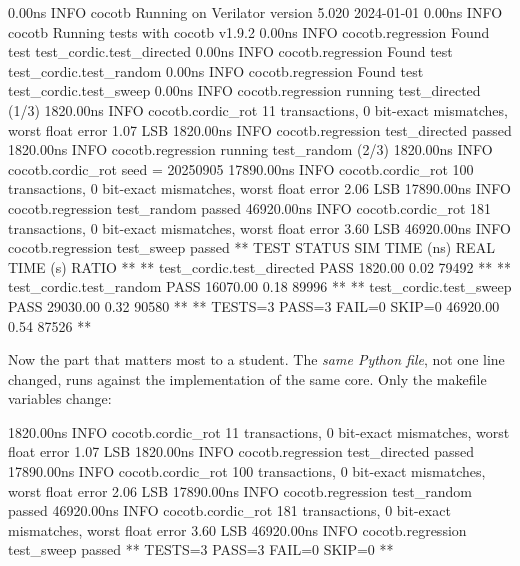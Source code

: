 \begin{txtcode}
     0.00ns INFO  cocotb  Running on Verilator version 5.020 2024-01-01
     0.00ns INFO  cocotb  Running tests with cocotb v1.9.2
     0.00ns INFO  cocotb.regression  Found test test_cordic.test_directed
     0.00ns INFO  cocotb.regression  Found test test_cordic.test_random
     0.00ns INFO  cocotb.regression  Found test test_cordic.test_sweep
     0.00ns INFO  cocotb.regression  running test_directed (1/3)
  1820.00ns INFO  cocotb.cordic_rot  11 transactions, 0 bit-exact
                                     mismatches, worst float error 1.07 LSB
  1820.00ns INFO  cocotb.regression  test_directed passed
  1820.00ns INFO  cocotb.regression  running test_random (2/3)
  1820.00ns INFO  cocotb.cordic_rot  seed = 20250905
 17890.00ns INFO  cocotb.cordic_rot  100 transactions, 0 bit-exact
                                     mismatches, worst float error 2.06 LSB
 17890.00ns INFO  cocotb.regression  test_random passed
 46920.00ns INFO  cocotb.cordic_rot  181 transactions, 0 bit-exact
                                     mismatches, worst float error 3.60 LSB
 46920.00ns INFO  cocotb.regression  test_sweep passed
 ** TEST                        STATUS  SIM TIME (ns)  REAL TIME (s)  RATIO **
 ** test_cordic.test_directed    PASS        1820.00           0.02   79492 **
 ** test_cordic.test_random      PASS       16070.00           0.18   89996 **
 ** test_cordic.test_sweep       PASS       29030.00           0.32   90580 **
 ** TESTS=3 PASS=3 FAIL=0 SKIP=0            46920.00           0.54   87526 **
\end{txtcode}

Now the part that matters most to a \VHDL{} student. The \emph{same Python
file}, not one line changed, runs against the \VHDL{} implementation of the
same core. Only the makefile variables change:


\begin{txtcode}
  1820.00ns INFO  cocotb.cordic_rot  11 transactions, 0 bit-exact
                                     mismatches, worst float error 1.07 LSB
  1820.00ns INFO  cocotb.regression  test_directed passed
 17890.00ns INFO  cocotb.cordic_rot  100 transactions, 0 bit-exact
                                     mismatches, worst float error 2.06 LSB
 17890.00ns INFO  cocotb.regression  test_random passed
 46920.00ns INFO  cocotb.cordic_rot  181 transactions, 0 bit-exact
                                     mismatches, worst float error 3.60 LSB
 46920.00ns INFO  cocotb.regression  test_sweep passed
 ** TESTS=3 PASS=3 FAIL=0 SKIP=0                                            **
\end{txtcode}

